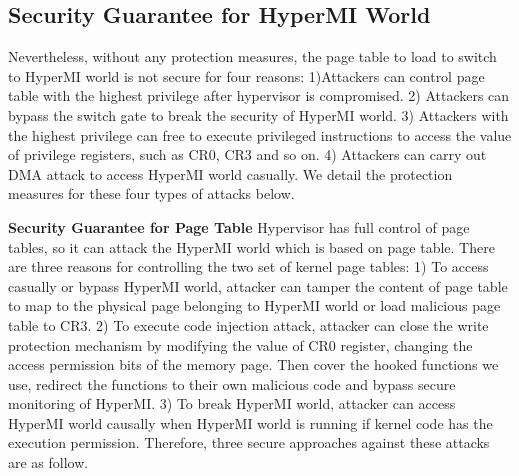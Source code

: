 \documentclass[conference]{IEEEtran}
\begin{document}
\subsection{Security Guarantee for HyperMI World}\label {SG}
Nevertheless, without any protection measures, the page table to load to switch to HyperMI world is not secure for four reasons: 1)Attackers can control page table with the highest privilege after hypervisor is compromised. 2) Attackers can bypass the switch gate to break the security of HyperMI world. 3) Attackers with the highest privilege can free to execute privileged instructions to access the value of privilege registers, such as CR0, CR3 and so on. 4) Attackers can carry out DMA attack to access HyperMI world casually.
We detail the protection measures for these four types of attacks below.


\textbf{Security Guarantee for Page Table}
Hypervisor has full control of page tables, so it can attack the HyperMI world which is based on page table.
There are three reasons for controlling the two set of kernel page tables: 1) To access casually or bypass HyperMI world, attacker can tamper the content of page table to map to the physical page belonging to HyperMI world or load malicious page table to CR3. 2) To execute code injection attack, attacker can close the write protection mechanism by modifying the value of CR0 register, changing the access permission bits of the memory page. Then cover the hooked functions we use, redirect the functions to their own malicious code and bypass secure monitoring of HyperMI. 3) To break HyperMI world, attacker can access HyperMI world causally when HyperMI world is running if kernel code has the execution permission. Therefore, three secure approaches against these attacks are as follow.
\end{document}
